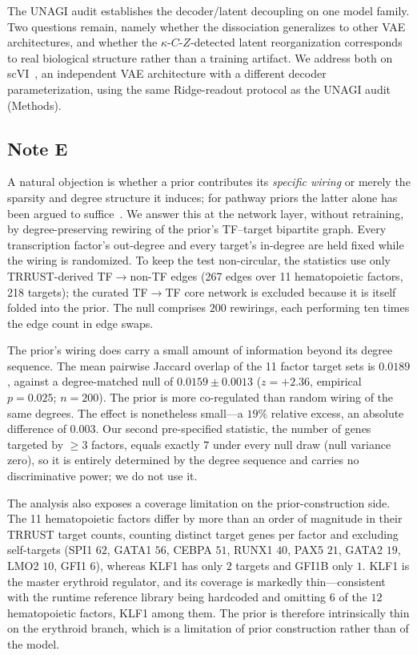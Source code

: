 \documentclass[11 pt,a4 paper]{article}
\begin{document}


The UNAGI audit establishes the decoder/latent decoupling on one model family. Two questions remain, namely whether the dissociation generalizes to other VAE architectures, and whether the $\kappa$-$C$-$Z$-detected latent reorganization corresponds to real biological structure rather than a training artifact. We address both on scVI~\cite{lopez2018}, an independent VAE architecture with a different decoder parameterization, using the same Ridge-readout protocol as the UNAGI audit (Methods).

\subsection*{Note E}

A natural objection is whether a prior contributes its \emph{specific wiring} or merely the sparsity and degree structure it induces; for pathway priors the latter alone has been argued to suffice~\cite{caranzano2026}. We answer this at the network layer, without retraining, by degree-preserving rewiring of the prior's TF--target bipartite graph. Every transcription factor's out-degree and every target's in-degree are held fixed while the wiring is randomized. To keep the test non-circular, the statistics use only TRRUST-derived TF$\to$non-TF edges (267 edges over 11 hematopoietic factors, 218 targets); the curated TF$\to$TF core network is excluded because it is itself folded into the prior. The null comprises $200$ rewirings, each performing ten times the edge count in edge swaps.

The prior's wiring does carry a small amount of information beyond its degree sequence. The mean pairwise Jaccard overlap of the 11 factor target sets is $0.0189$, against a degree-matched null of $0.0159\pm0.0013$ ($z=+2.36$, empirical $p=0.025$; $n=200$). The prior is more co-regulated than random wiring of the same degrees. The effect is nonetheless small---a $19\%$ relative excess, an absolute difference of $0.003$. Our second pre-specified statistic, the number of genes targeted by $\geq3$ factors, equals exactly $7$ under every null draw (null variance zero), so it is entirely determined by the degree sequence and carries no discriminative power; we do not use it.

The analysis also exposes a coverage limitation on the prior-construction side. The 11 hematopoietic factors differ by more than an order of magnitude in their TRRUST target counts, counting distinct target genes per factor and excluding self-targets (SPI1 $62$, GATA1 $56$, CEBPA $51$, RUNX1 $40$, PAX5 $21$, GATA2 $19$, LMO2 $10$, GFI1 $6$), whereas KLF1 has only $2$ targets and GFI1B only $1$. KLF1 is the master erythroid regulator, and its coverage is markedly thin---consistent with the runtime reference library being hardcoded and omitting $6$ of the $12$ hematopoietic factors, KLF1 among them. The prior is therefore intrinsically thin on the erythroid branch, which is a limitation of prior construction rather than of the model.
\end{document}
